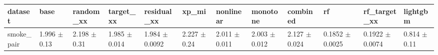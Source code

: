 \begin{tabular}{llllllllllll}
\toprule
dataset & base & random\_xx & target\_xx & residual\_xx & xp\_mi & nonlinear & monotone & combined & rf & rf\_target\_xx & lightgbm \\
\midrule
smoke\_pair & 1.996 $\pm$ 0.13 & 2.198 $\pm$ 0.31 & 1.985 $\pm$ 0.014 & 1.984 $\pm$ 0.0092 & 2.227 $\pm$ 0.24 & 2.011 $\pm$ 0.011 & 2.003 $\pm$ 0.012 & 2.127 $\pm$ 0.024 & 0.1852 $\pm$ 0.0025 & 0.1922 $\pm$ 0.0074 & 0.814 $\pm$ 0.11 \\
\bottomrule
\end{tabular}

